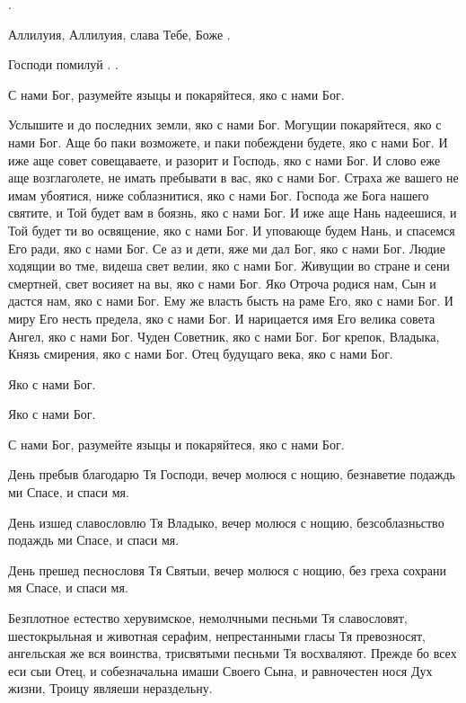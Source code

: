 \begin{mymulticols}
 . 

Аллилуия, Аллилуия, слава Тебе, Боже .

Господи помилуй . .


С нами Бог, разумейте языцы и покаряйтеся, яко с нами Бог.

Услышите и до последних земли, яко с нами Бог. Могущии покаряйтеся, яко с нами Бог. Аще бо паки возможете, и паки побеждени будете, яко с нами Бог. И иже аще совет совещаваете, и разорит и Господь, яко с нами Бог. И слово еже аще возглаголете, не имать пребывати в вас, яко с нами Бог. Страха же вашего не имам убоятися, ниже соблазнитися, яко с нами Бог. Господа же Бога нашего святите, и Той будет вам в боязнь, яко с нами Бог. И иже аще Нань надеешися, и Той будет ти во освящение, яко с нами Бог. И уповающе будем Нань, и спасемся Его ради, яко с нами Бог. Се аз и дети, яже ми дал Бог, яко с нами Бог. Людие ходящии во тме, видеша свет велии, яко с нами Бог. Живущии во стране и сени смертней, свет восияет на вы, яко с нами Бог. Яко Отроча родися нам, Сын и дастся нам, яко с нами Бог. Ему же власть бысть на раме Его, яко с нами Бог. И миру Его несть предела, яко с нами Бог. И нарицается имя Его велика совета Ангел, яко с нами Бог. Чуден Советник, яко с нами Бог. Бог крепок, Владыка, Князь смирения, яко с нами Бог. Отец будущаго века, яко с нами Бог.

 Яко с нами Бог.

 Яко с нами Бог. 

 С нами Бог, разумейте языцы и покаряйтеся, яко с нами Бог. 

 День пребыв благодарю Тя Господи, вечер молюся с нощию, безнаветие подаждь ми Спасе, и спаси мя.

 День изшед славословлю Тя Владыко, вечер молюся с нощию, безсоблазньство подаждь ми Спасе, и спаси мя.

 День прешед песнословя Тя Святыи, вечер молюся с нощию, без греха сохрани мя Спасе, и спаси мя.

Безплотное естество херувимское, немолчными песньми Тя славословят, шестокрыльная и животная серафим, непрестанными гласы Тя превозносят, ангельская же вся воинства, трисвятыми песньми Тя восхваляют. Прежде бо всех еси сыи Отец, и собезначальна имаши Своего Сына, и равночестен нося Дух жизни, Троицу являеши нераздельну.


\end{mymulticols}
